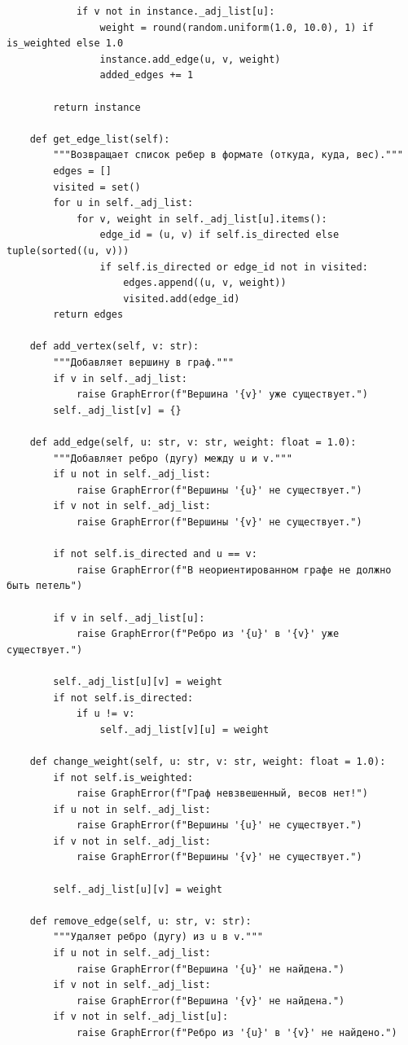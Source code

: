 \documentclass[referat]{SCWorks}
\begin{document}
\begin{verbatim}
            if v not in instance._adj_list[u]:
                weight = round(random.uniform(1.0, 10.0), 1) if is_weighted else 1.0
                instance.add_edge(u, v, weight)
                added_edges += 1

        return instance

    def get_edge_list(self):
        """Возвращает список ребер в формате (откуда, куда, вес)."""
        edges = []
        visited = set()
        for u in self._adj_list:
            for v, weight in self._adj_list[u].items():
                edge_id = (u, v) if self.is_directed else tuple(sorted((u, v)))
                if self.is_directed or edge_id not in visited:
                    edges.append((u, v, weight))
                    visited.add(edge_id)
        return edges

    def add_vertex(self, v: str):
        """Добавляет вершину в граф."""
        if v in self._adj_list:
            raise GraphError(f"Вершина '{v}' уже существует.")
        self._adj_list[v] = {}

    def add_edge(self, u: str, v: str, weight: float = 1.0):
        """Добавляет ребро (дугу) между u и v."""
        if u not in self._adj_list:
            raise GraphError(f"Вершины '{u}' не существует.")
        if v not in self._adj_list:
            raise GraphError(f"Вершины '{v}' не существует.")

        if not self.is_directed and u == v:
            raise GraphError(f"В неориентированном графе не должно быть петель")

        if v in self._adj_list[u]:
            raise GraphError(f"Ребро из '{u}' в '{v}' уже существует.")

        self._adj_list[u][v] = weight
        if not self.is_directed:
            if u != v:
                self._adj_list[v][u] = weight

    def change_weight(self, u: str, v: str, weight: float = 1.0):
        if not self.is_weighted:
            raise GraphError(f"Граф невзвешенный, весов нет!")
        if u not in self._adj_list:
            raise GraphError(f"Вершины '{u}' не существует.")
        if v not in self._adj_list:
            raise GraphError(f"Вершины '{v}' не существует.")

        self._adj_list[u][v] = weight

    def remove_edge(self, u: str, v: str):
        """Удаляет ребро (дугу) из u в v."""
        if u not in self._adj_list:
            raise GraphError(f"Вершина '{u}' не найдена.")
        if v not in self._adj_list:
            raise GraphError(f"Вершина '{v}' не найдена.")
        if v not in self._adj_list[u]:
            raise GraphError(f"Ребро из '{u}' в '{v}' не найдено.")


\end{verbatim}
\end{document}
